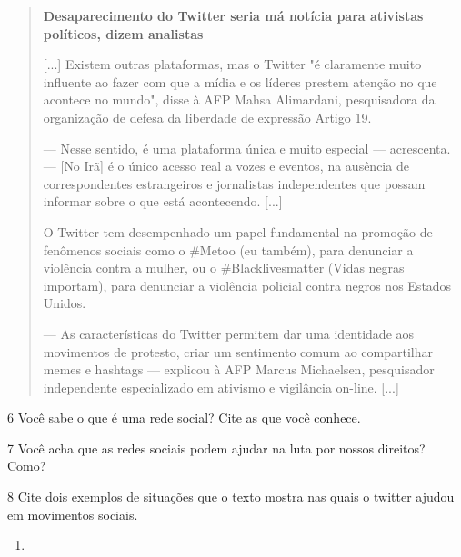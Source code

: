 \begin{itemize}
\begin{itemize}
\begin{itemize}
\begin{itemize}
{{\begin{itemize}
\begin{quote}
\textbf{Desaparecimento do Twitter seria má notícia para ativistas
políticos, dizem analistas }

[...]
Existem outras plataformas, mas o Twitter "é claramente muito influente
ao fazer com que a mídia e os líderes prestem atenção no que acontece no
mundo", disse à AFP Mahsa Alimardani, pesquisadora da organização de
defesa da liberdade de expressão Artigo 19.

--- Nesse sentido, é uma plataforma única e muito especial ---
acrescenta. --- {[}No Irã{]} é o único acesso real a vozes e eventos, na
ausência de correspondentes estrangeiros e jornalistas independentes que
possam informar sobre o que está acontecendo. [...]

O Twitter tem desempenhado um papel fundamental na promoção de fenômenos
sociais como o \#Metoo (eu também), para denunciar a violência contra a
mulher, ou o \#Blacklivesmatter (Vidas negras importam), para denunciar
a violência policial contra negros nos Estados Unidos.

--- As características do Twitter permitem dar uma identidade aos
movimentos de protesto, criar um sentimento comum ao compartilhar memes
e hashtags --- explicou à AFP Marcus Michaelsen, pesquisador independente especializado em ativismo e vigilância on-line. [...]

\end{quote}

\num{6} Você sabe o que é uma rede social? Cite as que você conhece.


\num{7} Você acha que as redes sociais podem ajudar na luta por nossos direitos? Como?


\num{8} Cite dois exemplos de situações que o texto mostra nas quais o twitter ajudou
em movimentos sociais.

\begin{enumerate}
\item {} 


\end{enumerate}
\end{itemize}}}
\end{itemize}
\end{itemize}
\end{itemize}
\end{itemize}
